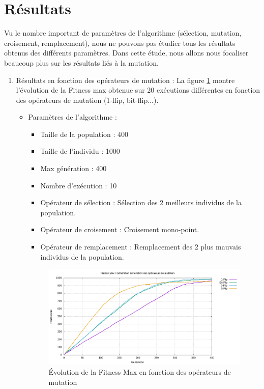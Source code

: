 \documentclass[12pt]{article}
\begin{document}
\section{Résultats}
Vu le nombre important de paramètres de l'algorithme (sélection, mutation, croisement, remplacement), nous ne pouvons pas étudier tous les résultats obtenus des différents paramètres. Dans cette étude, nous allons nous focaliser beaucoup plus sur les résultats liés à la mutation.
\begin{enumerate}
\item{Résultats en fonction des opérateurs de mutation :} La figure \ref{fitness_op_select} montre l'évolution de la Fitness max obtenue sur 20 exécutions différentes en fonction des opérateurs de mutation (1-flip, bit-flip...).
\begin{itemize}
\item{Paramètres de l'algorithme :}
	\begin{itemize}[label=-]
		\item{Taille de la population : } 400
		\item{Taille de l'individu :} 1000
		\item{Max génération :} 400
		\item{Nombre d'exécution :} 10
		\item{Opérateur de sélection :} Sélection des 2 meilleurs individus de la population.
		\item{Opérateur de croisement :} Croisement mono-point.
		\item{Opérateur de remplacement :} Remplacement des 2 plus mauvais individus de la population.
		\label{param_algo_1}
	\end{itemize} 

\begin{figure}[H]
		\begin{center}
			\includegraphics[scale=0.5]{img/fitness_op_select.png}
			\caption{Évolution de la Fitness Max en fonction des opérateurs de mutation}
			\label{fitness_op_select}
		\end{center}
\end{figure}


\end{itemize}
\end{enumerate}
\end{document}
